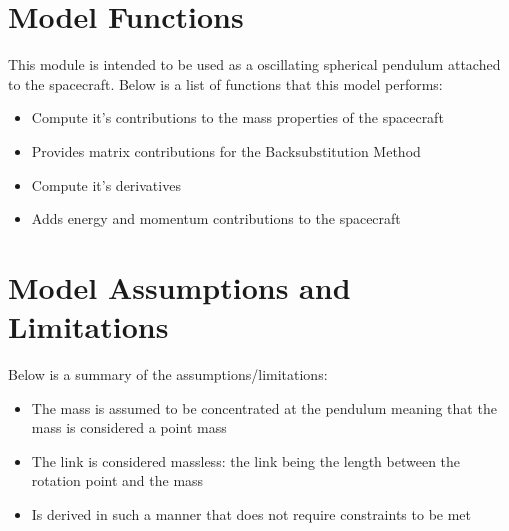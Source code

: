 \section{Model Functions}

This module is intended to be used as a oscillating spherical pendulum attached to the spacecraft. Below is a list of functions that this model performs:

\begin{itemize}
	\item Compute it's contributions to the mass properties of the spacecraft
	\item Provides matrix contributions for the Backsubstitution Method
	\item Compute it's derivatives
	\item Adds energy and momentum contributions to the spacecraft
\end{itemize}

\section{Model Assumptions and Limitations}
Below is a summary of the assumptions/limitations:

\begin{itemize}
	\item The mass is assumed to be concentrated at the pendulum meaning that the mass is considered a point mass
	\item The link is considered massless: the link being the length between the rotation point and the mass
	\item Is derived in such a manner that does not require constraints to be met
\end{itemize}
